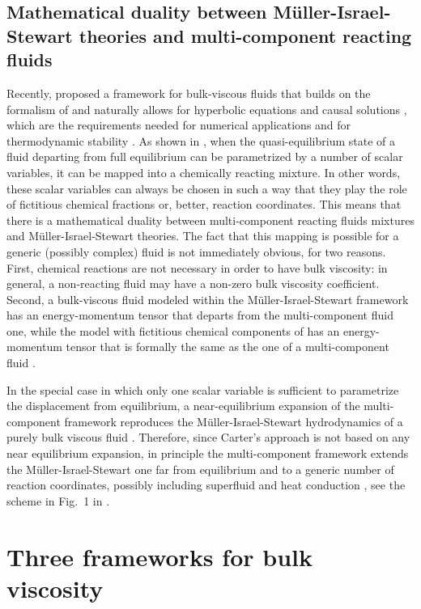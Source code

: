 \documentclass[aps,prd,twocolumn,a4paper,floatfix,nofootbib,superscriptaddress,nofootinbib]{revtex4}
\begin{document}
\subsection{Mathematical duality between M\"uller-Israel-Stewart theories and
multi-component reacting fluids}

Recently, \citet{Gavassino21bulk} proposed a framework for bulk-viscous fluids
that builds on the formalism of \citet{carter1991} and naturally allows for
hyperbolic equations and causal solutions \citep{GavassinoStabCarter2022}, which are the
requirements needed for numerical applications and for thermodynamic stability \citep{Gavassino21stable,GavassinoSuperluminal2021}.
As shown in \citet{Gavassino21bulk}, when the quasi-equilibrium state of a fluid departing from full equilibrium can be
parametrized by a number of scalar variables, it can be mapped into a chemically
reacting mixture. In other words, these scalar variables can always be chosen in such
a way that they play the role of fictitious chemical fractions or, better, reaction
coordinates. This means that there is a mathematical duality between multi-component reacting fluids
mixtures and M\"uller-Israel-Stewart theories. 
The fact that this mapping is possible for a generic (possibly complex) fluid is not immediately obvious, for two reasons.  
First, chemical reactions are not necessary in order to have bulk viscosity: in general, a non-reacting fluid may have a non-zero bulk viscosity coefficient. 
Second, a bulk-viscous fluid modeled within the M\"uller-Israel-Stewart
framework has an energy-momentum tensor that departs from the multi-component fluid one, while the
model with fictitious chemical components of \citet{Gavassino21bulk} 
has an energy-momentum tensor that is formally the same as the one of a
multi-component fluid \citep{carter1991}.

In the special case in which only one scalar variable is sufficient to
parametrize the displacement from equilibrium, a near-equilibrium expansion of
the multi-component framework reproduces the M\"uller-Israel-Stewart hydrodynamics of a
purely bulk viscous fluid \citep{Gavassino21bulk}. Therefore, since Carter's
approach is not based on any near equilibrium expansion, in principle the
multi-component framework extends the M\"uller-Israel-Stewart one far from
equilibrium and to a generic number of reaction coordinates, possibly including
superfluid and heat conduction \citep{carter1991,superbulk_PRD_2022}, see the scheme in Fig.~1 in
\citet{superbulk_PRD_2022}.

\section{Three frameworks for bulk viscosity}
\label{sec:theory}
\end{document}
